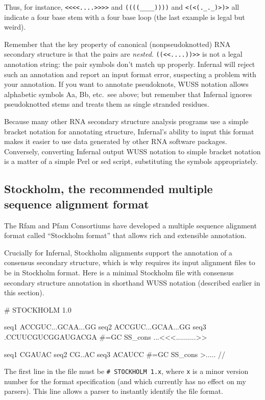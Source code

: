 Thus, for instance, \verb+<<<<....>>>>+ and \verb+((((____))))+ and
\verb+<(<(._._)>)>+ all indicate a four base stem with a four base
loop (the last example is legal but weird). 

Remember that the key property of canonical (nonpseudoknotted) RNA
secondary structure is that the pairs are \emph{nested}.
\verb+((<<....))>>+ is not a legal annotation string: the pair symbols
don't match up properly. Infernal will reject such an
annotation and report an input format error, suspecting a problem with
your annotation.  If you want to annotate pseudoknots, WUSS notation
allows alphabetic symbols Aa, Bb, etc.\, see above; but remember that
Infernal ignores pseudoknotted stems and treats them as
single stranded residues.

Because many other RNA secondary structure analysis programs use a
simple bracket notation for annotating structure,
Infernal's ability to input this format makes it easier to
use data generated by other RNA software packages. Conversely,
converting Infernal output WUSS notation to simple bracket
notation is a matter of a simple Perl or sed script, substituting the
symbols appropriately.

\subsection{Stockholm, the recommended multiple sequence alignment format}

The Rfam and Pfam Consortiums have developed a multiple sequence
alignment format called ``Stockholm format'' that allows rich and
extensible annotation. 

Crucially for Infernal, Stockholm alignments support the annotation of 
a consensus secondary structure, which is why  requires
its input alignment files to be in Stockholm format. Here is a minimal
Stockholm file with consensus secondary structure annotation in
shorthand WUSS notation (described earlier in this section).

\begin{sreoutput}
# STOCKHOLM 1.0

seq1           ACCGUC...GCAA...GG
seq2           ACCGUC...GCAA...GG
seq3           .CCUUCGUCGGAUGACGA
#=GC SS_cons   ...<<<..........>>

seq1           CGAUAC
seq2           CG..AC
seq3           ACAUCC
#=GC SS_cons   >.....
//
\end{sreoutput}

The first line in the file must be \verb+# STOCKHOLM 1.x+, where
\verb+x+ is a minor version number for the format specification
(and which currently has no effect on my parsers). This line allows a
parser to instantly identify the file format.

